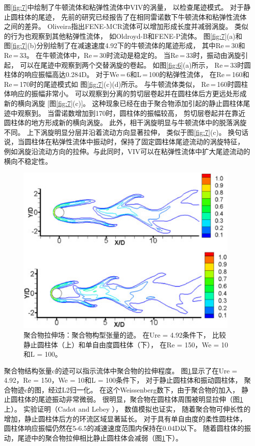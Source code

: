 \documentclass[UTF8,zihao=5]{ctexart} %
\begin{document}
图\ref{fig:7}中绘制了牛顿流体和粘弹性流体中VIV的涡量，
以检查尾迹模式。
对于静止圆柱体的尾迹，
先前的研究已经报告了在相同雷诺数下牛顿流体和粘弹性流体之间的差异。
Oliveira指出FENE-MCR流体可以增加形成长度并减弱涡旋。
类似的行为也观察到其他粘弹性流体，
如Oldroyd-B和FENE-P流体。
图\ref{fig:7}(a)和
图\ref{fig:7}(b)分别绘制了在减速速度4.92下的牛顿流体的尾迹形成，
其中Re = 30和Re = 33。
在牛顿流体中，Re = 30时流动是稳定的。
当Re = 33时，振动由涡旋引起，
可以在尾迹中观察到两个交替涡旋的卷起。
如图\ref{fig:6}(a)所示，
Re = 33时圆柱体的响应振幅高达0.284D。
对于We = 6和L = 100的粘弹性流体，
在Re = 160和Re = 170时的尾迹模式如
图\ref{fig:7}(c)(d)所示。
与牛顿流体类似，
Re = 160时圆柱体响应的振幅非常小。
可以观察到分离的剪切层卷起并在圆柱体后方更远处形成新的横向涡旋
[图\ref{fig:7}(c)]。
这种现象已经在由于聚合物添加引起的静止圆柱体尾迹中观察到。
当雷诺数增加到170时，圆柱体的振幅较高，
剪切层卷起并在靠近圆柱体的地方形成新的横向涡旋。
此外，相干涡旋明显与牛顿流体中的脱落涡旋不同。
上下涡旋明显分层并沿着流动方向显著拉伸，
类似于图\ref{fig:7}(c)。
换句话说，当圆柱体在粘弹性流体中振动时，保持了固定圆柱体尾迹流动的涡旋特征，
例如涡旋沿流动方向的拉伸。与此同时，VIV可以在粘弹性流体中扩大尾迹流动的横向不稳定性。


\begin{figure}[H]
    \centering
    \includegraphics[width=11cm]{fig8.jpg}
    \caption{
        聚合物拉伸场：聚合物构型张量的迹。
        在Ure = 4.92条件下，
        比较静止圆柱体（上）和单自由度圆柱体（下），
        在Re = 150，We = 10和L = 100。
    }
    \label{fig:8}
\end{figure}

聚合物结构张量c的迹可以指示流体中聚合物的拉伸程度。
图\ref{fig:8}显示了在Ure = 4.92，Re = 150，We = 10和L = 100条件下，
对于静止圆柱体和振动圆柱体，
聚合物迹c的图，经过L2归一化。
在这个Weissenberg数下，由于聚合物的加入，
静止圆柱体的尾迹振动非常微弱。
很明显，聚合物在圆柱体周围被明显拉伸（图\ref{fig:8}上）。
实验证明（Cadot and Lebey ），
数值模拟也证实，
随着聚合物可伸长性的增加，静止圆柱体后方的环流区域显著延长。
对于具有单自由度的柔性圆柱体，
圆柱体响应振幅仍然在5-6.5的减速速度范围内保持在0.04D以下。
随着圆柱体的振动，尾迹中的聚合物拉伸相比静止圆柱体会减弱（图\ref{fig:8}下）。
\end{document}
